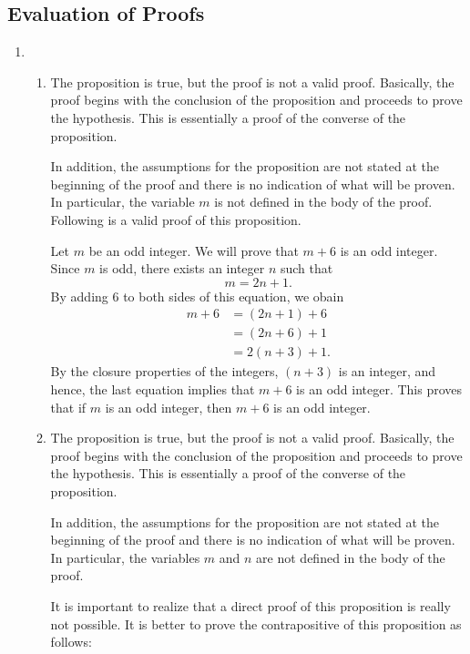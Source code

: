 \subsection*{Evaluation of Proofs}
\setcounter{oldenumi}{\theenumi}
\begin{enumerate} \setcounter{enumi}{\theoldenumi}
\item \begin{enumerate}
\item The proposition is true, but the proof is not a valid proof.  Basically, the proof begins with the conclusion of the proposition and proceeds to prove the hypothesis.  This is essentially a proof of the converse of the proposition.

In addition, the assumptions for the proposition are not stated at the beginning of the proof and there is no indication of what will be proven.  In particular, the variable $m$ is not defined in the body of the proof.  
Following is a valid proof of this proposition.

\begin{myproof}
Let $m$ be an odd integer.  We will prove that $m + 6$ is an odd integer.  Since $m$ is odd, there exists an integer $n$ such that
\[
m = 2n + 1.
\]
By adding 6 to both sides of this equation, we obain 
\[
\begin{aligned}
m +6 &= (2n + 1) + 6 \\
     &= (2n + 6) + 1 \\
     &= 2(n + 3) + 1.
\end{aligned}
\]
By the closure properties of the integers, $(n + 3)$ is an integer, and hence, the last equation implies that $m + 6$ is an odd integer.  This proves that if $m$ is an odd integer, then $m+6$ is an odd integer.
\end{myproof}


\item The proposition is true, but the proof is not a valid proof.  Basically, the proof begins with the conclusion of the proposition and proceeds to prove the hypothesis.  This is essentially a proof of the converse of the proposition.

In addition, the assumptions for the proposition are not stated at the beginning of the proof and there is no indication of what will be proven.  In particular, the variables $m$ and $n$ are not defined in the body of the proof.

It is important to realize that a direct proof of this proposition is really not possible.  It is better to prove the contrapositive of this proposition as follows:


\end{enumerate}
\end{enumerate}
